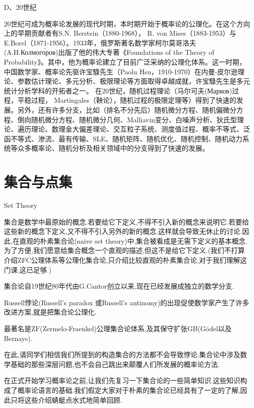 D、20世纪

20世纪可成为概率论发展的现代时期，本时期开始于概率论的公理化。在这个方向上的早期贡献者有S.N. Berstein（1880-1968）， R. von Mises（1883-1953）与E.Borel（1871-1956）。1933年，俄罗斯著名数学家柯尔莫哥洛夫(A.H.Колмого́ров)出版了他的伟大专著《Foundations of the Theory of Probability》。其中，他为概率论建立了目前广泛采纳的公理化体系。这一时期，中国数学家、概率论先驱许宝騄先生（Paolu Hsu，1910-1970）在内曼-皮尔逊理论、参数估计理论、多元分析、极限理论等方面取得卓越成就，许宝騄先生是多元统计分析学科的开拓者之一。
在20世纪，随机过程理论（马尔可夫(Марков)过程，平稳过程， Martingales（鞅论），随机过程的极限定理等）得到了快速的发展。另外，还有许多分支，比如（排名不分先后）随机微分方程、随机偏微分方程、倒向随机微分方程、随机微分几何、Malliavin变分、白噪声分析、狄氏型理论、遍历理论、数理金大偏差理论、交互粒子系统、测度值过程、概率不等式、泛函不等式、渗流、最有传输、SLE、随机矩阵、随机优化、随机控制、随机动力系统等众多概率论、随机分析及相关领域中的分支得到了快速的发展。




\section{集合与点集}

{Set Theory}

集合是数学中最原始的概念.若要给它下定义,不得不引入新的概念来说明它.若要给这些新的概念下定义,又不得不引入另外的新的概念.这样就会导致无休止的讨论.因此,在直观的朴素集合论(naive set theory)中,集合被看成是无需下定义的基本概念.为了方便,我们愿意给集合概念一个直观的描述,但这不是给它下定义.(我们不打算介绍ZFC公理体系等公理化集合论,只介绍比较直观的朴素集合论,对于我们理解这门课,这已足够.)

\begin{blist}
	\item 集合论自19世纪80年代由G.Cantor创立以来,现在已经发展成独立的数学分支.
	\item Russell悖论(Russell's paradox 或Russell's antinomy)的出现促使数学家产生了许多改进方案,就是把集合论公理化.
	
	\item 最著名是ZF(Zermelo-Fraenkel)公理集合论体系,及其保守扩张GB(Gödel以及Bernays).
\end{blist}

在此,请同学们相信我们所提到的构造集合的方法都不会导致悖论.集合论中涉及数学基础的那些深层问题,也不会自己跳出来颠覆人们所发展的概率论方法.

在正式开始学习概率论之前,让我们先复习一下集合论的一些简单知识.这些知识构成了概率论语言的基础.我们假定大家对于朴素的集合论已经具有了一定的了解,因此只将这些介绍蜻蜓点水式地简单回顾.


